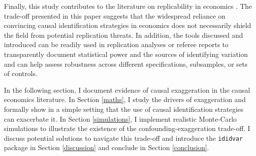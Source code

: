 			Finally, this study contributes to the literature on replicability in economics \citep{camerer_evaluating_2016, ioannidis_power_2017, christensen_transparency_2018, kasy_forking_2021}. The trade-off presented in this paper suggests that the widespread reliance on convincing causal identification strategies in economics does not necessarily shield the field from potential replication threats. In addition, the tools discussed and introduced can be readily used in replication analyses or referee reports to transparently document statistical power and the sources of identifying variation and can help assess robustness across different specifications, subsamples, or sets of controls.
			
			In the following section, I document evidence of causal exaggeration in the causal  economics literature. In Section \ref{maths}, I study the drivers of exaggeration and formally show in a simple setting that the use of causal identification strategies can exacerbate it. In Section  \ref{simulations}, I implement realistic Monte-Carlo simulations to illustrate the existence of the confounding-exaggeration trade-off. I discuss potential solutions to navigate this trade-off and introduce the \verb?ididvar? package in Section \ref{discussion} and conclude in Section \ref{conclusion}.
	
	
		